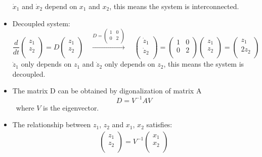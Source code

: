 \documentclass[12pt,a4paper]{article}
\begin{document}
\begin{tcolorbox}[breakable]
\begin{itemize}
$\dot{x}_{1}$ and $\dot{x}_{2}$ depend on $x_{1}$ and $x_{2}$, this means the system is interconnected. 
\item Decoupled system:
\begin{equation*}
\frac{d}{dt} 
\begin{pmatrix}
z_{1}\\
z_{2}\\
\end{pmatrix}
=D
\begin{pmatrix}
z_{1}\\
z_{2}\\
\end{pmatrix} \quad \xrightarrow{D=\begin{pmatrix}
1 & 0\\
0 & 2\\
\end{pmatrix}} \quad 
\begin{pmatrix}
\dot{z}_{1}\\
\dot{z}_{2}\\
\end{pmatrix} = 
\begin{pmatrix}
1 & 0\\
0 & 2\\
\end{pmatrix}
\begin{pmatrix}
z_{1}\\
z_{2}\\
\end{pmatrix} = \begin{pmatrix}
z_{1}\\
2z_{2}\\
\end{pmatrix}
\end{equation*}
$\dot{z}_{1}$ only depends on $z_{1}$ and $\dot{z}_{2}$ only depends on $z_{2}$, this means the system is decoupled. 
\item The matrix D can be obtained by digonalization of matrix A
\[D =  V^{-1}AV\]
 \ where $V$ is the eigenvector.
\item The relationship between $z_{1}$, $z_{2}$ and $x_{1}$, $x_{2}$ satisfies:
\begin{gather*}
\begin{pmatrix}
z_{1}\\
z_{2}\\
\end{pmatrix}
=V^{-1}
\begin{pmatrix}
x_{1}\\
x_{2}\\

\end{pmatrix}
\end{gather*}
\end{itemize}
\end{tcolorbox}
\end{document}
